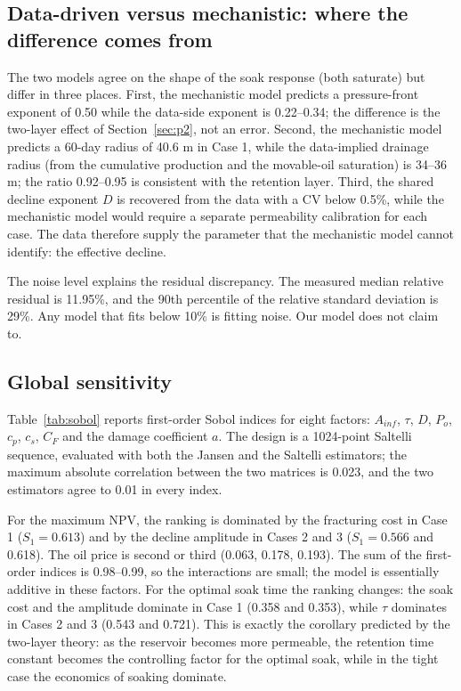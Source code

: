 \documentclass{swmcmthesis}
\begin{document}
\subsection{Data-driven versus mechanistic: where the difference comes from}
The two models agree on the shape of the soak response (both saturate) but differ in three places. First, the mechanistic model predicts a pressure-front exponent of 0.50 while the data-side exponent is 0.22--0.34; the difference is the two-layer effect of Section~\ref{sec:p2}, not an error. Second, the mechanistic model predicts a 60-day radius of 40.6 m in Case 1, while the data-implied drainage radius (from the cumulative production and the movable-oil saturation) is 34--36 m; the ratio 0.92--0.95 is consistent with the retention layer. Third, the shared decline exponent $D$ is recovered from the data with a CV below 0.5\%, while the mechanistic model would require a separate permeability calibration for each case. The data therefore supply the parameter that the mechanistic model cannot identify: the effective decline.

The noise level explains the residual discrepancy. The measured median relative residual is 11.95\%, and the 90th percentile of the relative standard deviation is 29\%. Any model that fits below 10\% is fitting noise. Our model does not claim to.

\subsection{Global sensitivity}
Table~\ref{tab:sobol} reports first-order Sobol \cite{sobol,saltelli} indices for eight factors: $A_{inf}$, $\tau$, $D$, $P_{o}$, $c_{p}$, $c_{s}$, $C_{F}$ and the damage coefficient $a$. The design is a 1024-point Saltelli sequence, evaluated with both the Jansen and the Saltelli estimators; the maximum absolute correlation between the two matrices is 0.023, and the two estimators agree to 0.01 in every index.



For the maximum NPV, the ranking is dominated by the fracturing cost in Case 1 ($S_1=0.613$) and by the decline amplitude in Cases 2 and 3 ($S_1=0.566$ and 0.618). The oil price is second or third (0.063, 0.178, 0.193). The sum of the first-order indices is 0.98--0.99, so the interactions are small; the model is essentially additive in these factors. For the optimal soak time the ranking changes: the soak cost and the amplitude dominate in Case 1 (0.358 and 0.353), while $\tau$ dominates in Cases 2 and 3 (0.543 and 0.721). This is exactly the corollary predicted by the two-layer theory: as the reservoir becomes more permeable, the retention time constant becomes the controlling factor for the optimal soak, while in the tight case the economics of soaking dominate.
\end{document}
